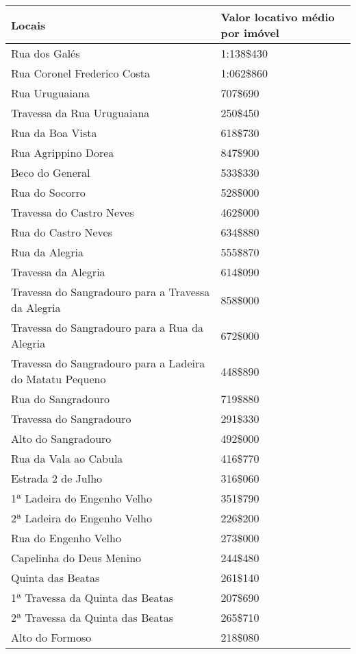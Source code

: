 \begin{table}[!htp]
{
\begin{tiny}
\begin{tabular}{ll}
\hline
Locais	&Valor locativo médio por imóvel\\
\hline
\hline
Rua dos Galés	&1:138\$430\\
Rua Coronel Frederico Costa	&1:062\$860\\
Rua Uruguaiana	&707\$690\\
Travessa da Rua Uruguaiana	&250\$450\\
Rua da Boa Vista	&618\$730\\
Rua Agrippino Dorea	&847\$900\\
Beco do General	&533\$330\\
Rua do Socorro	&528\$000\\
Travessa do Castro Neves	&462\$000\\
Rua do Castro Neves	&634\$880\\
Rua da Alegria	&555\$870\\
Travessa da Alegria	&614\$090\\
Travessa do Sangradouro para a Travessa da Alegria	&858\$000\\
Travessa do Sangradouro para a Rua da Alegria	&672\$000\\
Travessa do Sangradouro para a Ladeira do Matatu Pequeno	&448\$890\\
Rua do Sangradouro	&719\$880\\
Travessa do Sangradouro	&291\$330\\
Alto do Sangradouro	&492\$000\\
Rua da Vala ao Cabula	&416\$770\\
Estrada 2 de Julho	&316\$060\\
1ª Ladeira do Engenho Velho	&351\$790\\
2ª Ladeira do Engenho Velho	&226\$200\\
Rua do Engenho Velho	&273\$000\\
Capelinha do Deus Menino	&244\$480\\
Quinta das Beatas	&261\$140\\
1ª Travessa da Quinta das Beatas	&207\$690\\
2ª Travessa da Quinta das Beatas	&265\$710\\
Alto do Formoso	&218\$080\\

\end{tabular}
\end{tiny}}
\end{table}

